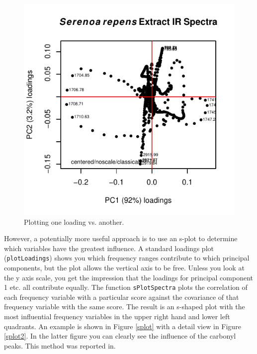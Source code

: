 \documentclass[letter,10pt,twocolumn,twoside,printwatermark=false]{pinp}
\begin{document}
\begin{Shaded}
\begin{Highlighting}[]
\StringTok{ }
   \NormalTok{(}\NormalTok{, }\NormalTok{),}
   \NormalTok{)}
\end{Highlighting}
\end{Shaded}

\begin{figure}

{\centering \includegraphics{ChemoSpec2_files/figure-latex/Chunk30-1} 

}

\caption{\label{load2}Plotting one loading vs. another.}\label{fig:Chunk30}
\end{figure}

However, a potentially more useful approach is to use an s-plot to
determine which variables have the greatest influence. A standard
loadings plot (\texttt{plotLoadings}) shows you which frequency ranges
contribute to which principal components, but the plot allows the
vertical axis to be free. Unless you look at the y axis scale, you get
the impression that the loadings for principal component 1 etc. all
contribute equally. The function \texttt{sPlotSpectra} plots the
correlation of each frequency variable with a particular score against
the covariance of that frequency variable with the same score. The
result is an s-shaped plot with the most influential frequency variables
in the upper right hand and lower left quadrants. An example is shown in
Figure \ref{splot} with a detail view in Figure \ref{splot2}. In the
latter figure you can clearly see the influence of the carbonyl peaks.
This method was reported in\cite{Wiklund2008}.
\end{document}
